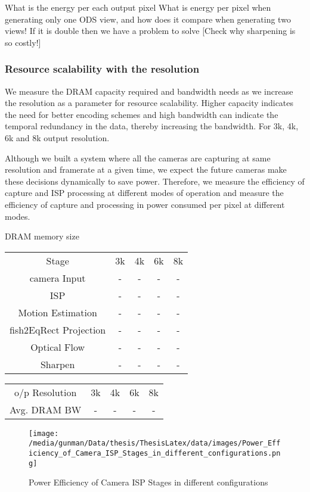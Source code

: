 What is the energy per each output pixel	
What is energy per pixel when generating only one ODS view, and how does it compare when generating two views! If it is double then we have a problem to solve	
[Check why sharpening is so costly!]

\subsubsection{Resource scalability with the resolution}
We measure the DRAM capacity required and bandwidth needs as we increase the resolution as a parameter for resource scalability. Higher capacity indicates the need for better encoding schemes and high bandwidth can indicate the temporal redundancy in the data, thereby increasing the bandwidth. For 3k, 4k, 6k and 8k output resolution.

Although we built a system where all the cameras are capturing at same resolution and framerate at a given time, we expect the future cameras make these decisions dynamically to save power. Therefore, we  measure the efficiency of capture and ISP processing at different modes of operation and measure the efficiency of capture and processing in power consumed per pixel at different modes.

DRAM memory size\newline
\begin{tabular}{c|c|c|c|c}
	Stage & 3k & 4k & 6k & 8k \\
	camera Input & - & - & - & - \\
	ISP & - & - & - & - \\
	Motion Estimation & - & - & - & - \\
	fish2EqRect Projection & - & - & - & - \\
	Optical Flow & - & - & - & - \\
	Sharpen & - & - & - & - \\
\end{tabular} 

\vspace{10mm}
\begin{tabular}{c|c|c|c|c}
	o/p Resolution & 3k & 4k & 6k & 8k \\
	Avg. DRAM BW & - & - & - & - \\
\end{tabular} 
\vspace{30mm}

\begin{figure*}
	\begin{center}
		\texttt{[image: /media/gunman/Data/thesis/ThesisLatex/data/images/Power\_Efficiency\_of\_Camera\_ISP\_Stages\_in\_different\_configurations.png]}
		\caption{Power Efficiency of Camera ISP Stages in different configurations}
		\label{fig:ex_4_9}
	\end{center}
	\vspace{-0.3in}
\end{figure*} 

